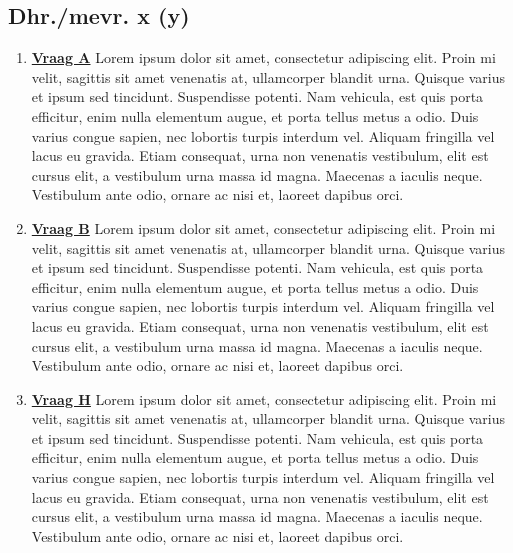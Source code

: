 \documentclass{hogent-article}
\begin{document}
\subsection{Dhr./mevr. x (y)}

\vspace{5pt}

\begin{enumerate}
    \item \textbf{\underline{Vraag A}}\vspace{5pt}\newline
    Lorem ipsum dolor sit amet, consectetur adipiscing elit. Proin mi velit, sagittis sit amet venenatis at, ullamcorper blandit urna. Quisque varius et ipsum sed tincidunt. Suspendisse potenti. Nam vehicula, est quis porta efficitur, enim nulla elementum augue, et porta tellus metus a odio. Duis varius congue sapien, nec lobortis turpis interdum vel. Aliquam fringilla vel lacus eu gravida. Etiam consequat, urna non venenatis vestibulum, elit est cursus elit, a vestibulum urna massa id magna. Maecenas a iaculis neque. Vestibulum ante odio, ornare ac nisi et, laoreet dapibus orci.
  \vspace{5pt}
    \item \textbf{\underline{Vraag B}}\vspace{5pt}\newline
    Lorem ipsum dolor sit amet, consectetur adipiscing elit. Proin mi velit, sagittis sit amet venenatis at, ullamcorper blandit urna. Quisque varius et ipsum sed tincidunt. Suspendisse potenti. Nam vehicula, est quis porta efficitur, enim nulla elementum augue, et porta tellus metus a odio. Duis varius congue sapien, nec lobortis turpis interdum vel. Aliquam fringilla vel lacus eu gravida. Etiam consequat, urna non venenatis vestibulum, elit est cursus elit, a vestibulum urna massa id magna. Maecenas a iaculis neque. Vestibulum ante odio, ornare ac nisi et, laoreet dapibus orci.
  \vspace{5pt}
    \item \textbf{\underline{Vraag H}}\vspace{5pt}\newline
    Lorem ipsum dolor sit amet, consectetur adipiscing elit. Proin mi velit, sagittis sit amet venenatis at, ullamcorper blandit urna. Quisque varius et ipsum sed tincidunt. Suspendisse potenti. Nam vehicula, est quis porta efficitur, enim nulla elementum augue, et porta tellus metus a odio. Duis varius congue sapien, nec lobortis turpis interdum vel. Aliquam fringilla vel lacus eu gravida. Etiam consequat, urna non venenatis vestibulum, elit est cursus elit, a vestibulum urna massa id magna. Maecenas a iaculis neque. Vestibulum ante odio, ornare ac nisi et, laoreet dapibus orci.
\end{enumerate}
\end{document}
